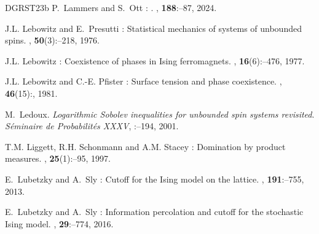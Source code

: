 \documentclass[11pt,a4paper]{article}
\theoremstyle{definition}
\numberwithin{equation}{section}
\begin{document}
\begin{thebibliography}{DGRST23b}
P.~\bgroup\fonteauteurs\bgroup Lammers\egroup\egroup{} and S.~\bgroup\fonteauteurs\bgroup Ott\egroup\egroup{} :
.
, \textbf{188}\string:--87, 2024.

J.L. \bgroup\fonteauteurs\bgroup Lebowitz\egroup\egroup{} and E.~\bgroup\fonteauteurs\bgroup Presutti\egroup\egroup{} :
\newblock Statistical mechanics of systems of unbounded spins.
, \textbf{50}(3)\string:--218, 1976.


J.L. \bgroup\fonteauteurs\bgroup Lebowitz\egroup\egroup{} :
\newblock Coexistence of phases in {I}sing ferromagnets.
, \textbf{16}(6)\string:--476, 1977.

J.L. \bgroup\fonteauteurs\bgroup Lebowitz\egroup\egroup{} and C.-E. \bgroup\fonteauteurs\bgroup Pfister\egroup\egroup{} :
\newblock Surface tension and phase coexistence.
, \textbf{46}(15)\string:, 1981.

\bgroup\fonteauteurs\bgroup M.~Ledoux\egroup\egroup. 
\emph{Logarithmic Sobolev inequalities for unbounded spin systems revisited}. 
\emph{S{\'e}minaire de Probabilit{\'e}s XXXV}, \textbf{}:--194, 2001.

T.M. \bgroup\fonteauteurs\bgroup Liggett\egroup\egroup{}, R.H. \bgroup\fonteauteurs\bgroup Schonmann\egroup\egroup{} and A.M. \bgroup\fonteauteurs\bgroup Stacey\egroup\egroup{} :
\newblock Domination by product measures.
, \textbf{25}(1)\string:--95, 1997.

E.~\bgroup\fonteauteurs\bgroup Lubetzky\egroup\egroup{} and A.~\bgroup\fonteauteurs\bgroup Sly\egroup\egroup{} :
\newblock Cutoff for the Ising model on the lattice.
, \textbf{191}\string:--755, 2013.

E.~\bgroup\fonteauteurs\bgroup Lubetzky\egroup\egroup{} and A.~\bgroup\fonteauteurs\bgroup Sly\egroup\egroup{} :
\newblock Information percolation and cutoff for the stochastic Ising model.
, \textbf{29}\string:--774, 2016.


\end{thebibliography}
\end{document}

